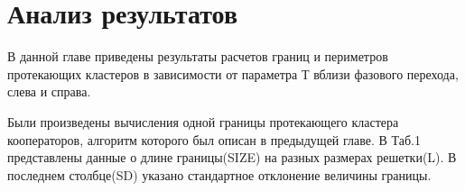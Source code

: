 \documentclass[14pt]{article}
\begin{document}
\section{Анализ результатов}
\par В данной главе приведены результаты расчетов границ и периметров протекающих кластеров в зависимости от параметра Т вблизи фазового перехода, слева и справа.
\\

\par Были произведены вычисления одной границы протекающего кластера кооператоров, алгоритм которого был описан в предыдущей главе. В Таб.1 представлены данные о длине границы(SIZE) на разных размерах решетки(L). В последнем столбце(SD) указано стандартное отклонение величины границы. 

\begin{figure}[H]
	\begin{floatrow}
	
	\end{floatrow}
\end{figure}
\end{document}
